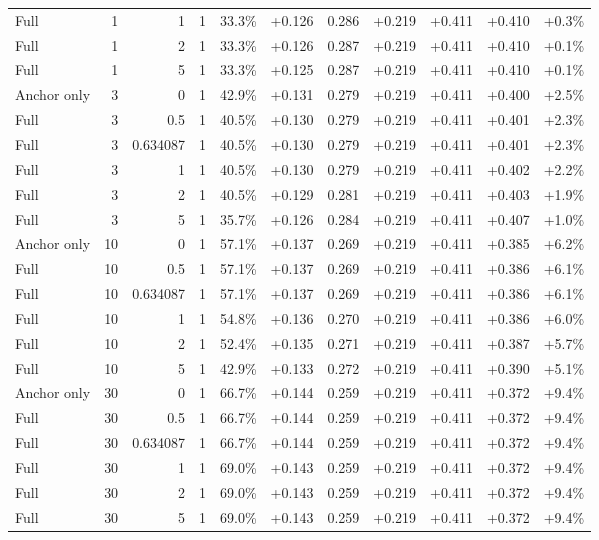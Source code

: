 \begin{table}[htbp]
\begin{tabular}{lrrrccccccc}
Full & 1 & 1 & 1 & 33.3\% & +0.126 & 0.286 & +0.219 & +0.411 & +0.410 & +0.3\% \\
Full & 1 & 2 & 1 & 33.3\% & +0.126 & 0.287 & +0.219 & +0.411 & +0.410 & +0.1\% \\
Full & 1 & 5 & 1 & 33.3\% & +0.125 & 0.287 & +0.219 & +0.411 & +0.410 & +0.1\% \\
Anchor only & 3 & 0 & 1 & 42.9\% & +0.131 & 0.279 & +0.219 & +0.411 & +0.400 & +2.5\% \\
Full & 3 & 0.5 & 1 & 40.5\% & +0.130 & 0.279 & +0.219 & +0.411 & +0.401 & +2.3\% \\
Full & 3 & 0.634087 & 1 & 40.5\% & +0.130 & 0.279 & +0.219 & +0.411 & +0.401 & +2.3\% \\
Full & 3 & 1 & 1 & 40.5\% & +0.130 & 0.279 & +0.219 & +0.411 & +0.402 & +2.2\% \\
Full & 3 & 2 & 1 & 40.5\% & +0.129 & 0.281 & +0.219 & +0.411 & +0.403 & +1.9\% \\
Full & 3 & 5 & 1 & 35.7\% & +0.126 & 0.284 & +0.219 & +0.411 & +0.407 & +1.0\% \\
Anchor only & 10 & 0 & 1 & 57.1\% & +0.137 & 0.269 & +0.219 & +0.411 & +0.385 & +6.2\% \\
Full & 10 & 0.5 & 1 & 57.1\% & +0.137 & 0.269 & +0.219 & +0.411 & +0.386 & +6.1\% \\
Full & 10 & 0.634087 & 1 & 57.1\% & +0.137 & 0.269 & +0.219 & +0.411 & +0.386 & +6.1\% \\
Full & 10 & 1 & 1 & 54.8\% & +0.136 & 0.270 & +0.219 & +0.411 & +0.386 & +6.0\% \\
Full & 10 & 2 & 1 & 52.4\% & +0.135 & 0.271 & +0.219 & +0.411 & +0.387 & +5.7\% \\
Full & 10 & 5 & 1 & 42.9\% & +0.133 & 0.272 & +0.219 & +0.411 & +0.390 & +5.1\% \\
Anchor only & 30 & 0 & 1 & 66.7\% & +0.144 & 0.259 & +0.219 & +0.411 & +0.372 & +9.4\% \\
Full & 30 & 0.5 & 1 & 66.7\% & +0.144 & 0.259 & +0.219 & +0.411 & +0.372 & +9.4\% \\
Full & 30 & 0.634087 & 1 & 66.7\% & +0.144 & 0.259 & +0.219 & +0.411 & +0.372 & +9.4\% \\
Full & 30 & 1 & 1 & 69.0\% & +0.143 & 0.259 & +0.219 & +0.411 & +0.372 & +9.4\% \\
Full & 30 & 2 & 1 & 69.0\% & +0.143 & 0.259 & +0.219 & +0.411 & +0.372 & +9.4\% \\
Full & 30 & 5 & 1 & 69.0\% & +0.143 & 0.259 & +0.219 & +0.411 & +0.372 & +9.4\% \\

\end{tabular}
\end{table}
